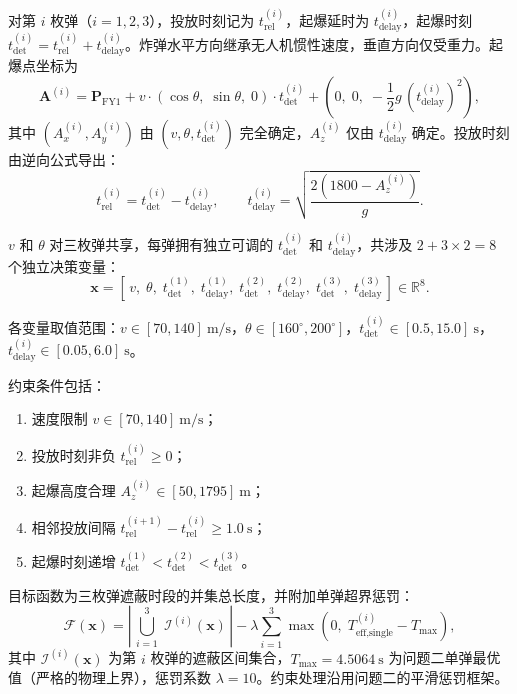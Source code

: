 \documentclass{ctexart}
\begin{document}
对第 $i$ 枚弹（$i=1,2,3$），投放时刻记为 $t_{\text{rel}}^{(i)}$，起爆延时为 $t_{\text{delay}}^{(i)}$，起爆时刻 $t_{\text{det}}^{(i)} = t_{\text{rel}}^{(i)} + t_{\text{delay}}^{(i)}$。炸弹水平方向继承无人机惯性速度，垂直方向仅受重力。起爆点坐标为
\[
\mathbf{A}^{(i)} = \mathbf{P}_{\text{FY1}} + v \cdot (\cos\theta,\; \sin\theta,\; 0) \cdot t_{\text{det}}^{(i)} + \left(0,\; 0,\; -\frac{1}{2}g\,(t_{\text{delay}}^{(i)})^2\right),
\]
其中 $(A_x^{(i)}, A_y^{(i)})$ 由 $(v,\theta,t_{\text{det}}^{(i)})$ 完全确定，$A_z^{(i)}$ 仅由 $t_{\text{delay}}^{(i)}$ 确定。投放时刻由逆向公式导出：
\[
t_{\text{rel}}^{(i)} = t_{\text{det}}^{(i)} - t_{\text{delay}}^{(i)}, \qquad
t_{\text{delay}}^{(i)} = \sqrt{\frac{2(1800 - A_z^{(i)})}{g}}.
\]

$v$ 和 $\theta$ 对三枚弹共享，每弹拥有独立可调的 $t_{\text{det}}^{(i)}$ 和 $t_{\text{delay}}^{(i)}$，共涉及 $2 + 3 \times 2 = 8$ 个独立决策变量：
\begin{equation}
\mathbf{x} = \left[\,v,\; \theta,\; t_{\text{det}}^{(1)},\; t_{\text{delay}}^{(1)},\; t_{\text{det}}^{(2)},\; t_{\text{delay}}^{(2)},\; t_{\text{det}}^{(3)},\; t_{\text{delay}}^{(3)}\,\right] \in \mathbb{R}^8. \label{eq:x3}
\end{equation}

各变量取值范围：$v \in [70, 140]\ \mathrm{m/s}$，$\theta \in [160^\circ, 200^\circ]$，$t_{\text{det}}^{(i)} \in [0.5, 15.0]\ \mathrm{s}$，$t_{\text{delay}}^{(i)} \in [0.05, 6.0]\ \mathrm{s}$。

约束条件包括：
\begin{enumerate}
    \item 速度限制 $v \in [70, 140]\ \mathrm{m/s}$；
    \item 投放时刻非负 $t_{\text{rel}}^{(i)} \geq 0$；
    \item 起爆高度合理 $A_z^{(i)} \in [50, 1795]\ \mathrm{m}$；
    \item 相邻投放间隔 $t_{\text{rel}}^{(i+1)} - t_{\text{rel}}^{(i)} \geq 1.0\ \mathrm{s}$；
    \item 起爆时刻递增 $t_{\text{det}}^{(1)} < t_{\text{det}}^{(2)} < t_{\text{det}}^{(3)}$。
\end{enumerate}

目标函数为三枚弹遮蔽时段的并集总长度，并附加单弹超界惩罚：
\begin{equation}
\mathcal{F}(\mathbf{x}) = \left|\,\bigcup_{i=1}^{3}\;\mathcal{I}^{(i)}(\mathbf{x})\,\right| - \lambda \sum_{i=1}^{3} \max\left(0,\; T_{\text{eff,single}}^{(i)} - T_{\max}\right), \label{eq:obj3}
\end{equation}
其中 $\mathcal{I}^{(i)}(\mathbf{x})$ 为第 $i$ 枚弹的遮蔽区间集合，$T_{\max} = 4.5064\ \mathrm{s}$ 为问题二单弹最优值（严格的物理上界），惩罚系数 $\lambda = 10$。约束处理沿用问题二的平滑惩罚框架。
\end{document}
